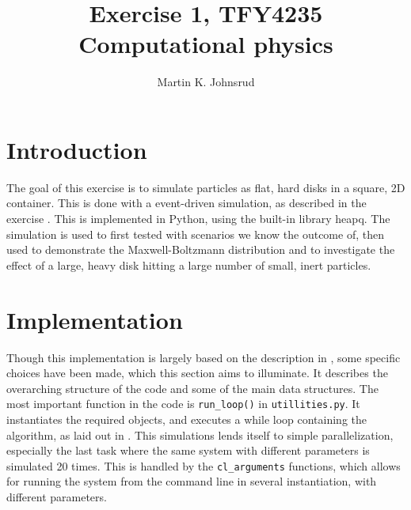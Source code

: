 \documentclass{article}
\title{Exercise 1, TFY4235 Computational physics}
\author{Martin K. Johnsrud}
\date{}
\begin{document}
    \maketitle
    \section*{Introduction}
    The goal of this exercise is to simulate particles as flat, hard disks in a square, 2D container.
    This is done with a event-driven simulation, as described in the exercise \cite{exercise}.
    This is implemented in Python, using the built-in library heapq.
    The simulation is used to first tested with scenarios we know the outcome of, then used to demonstrate the Maxwell-Boltzmann distribution and to investigate the effect of a large, heavy disk hitting a large number of small, inert particles.

    \section*{Implementation}
    Though this implementation is largely based on the description in \cite{exercise}, some specific choices have been made, which this section aims to illuminate.
    It describes the overarching structure of the code and some of the main data structures.
    The most important function in the code is \verb|run_loop()| in \verb|utillities.py|.
    It instantiates the required objects, and executes a while loop containing the algorithm, as laid out in \cite{exercise}.
    This simulations lends itself to simple parallelization, especially the last task where the same system with different parameters is simulated 20 times.
    This is handled by the \verb|cl_arguments| functions, which allows for running the system from the command line in several instantiation, with different parameters.
    
\end{document}
